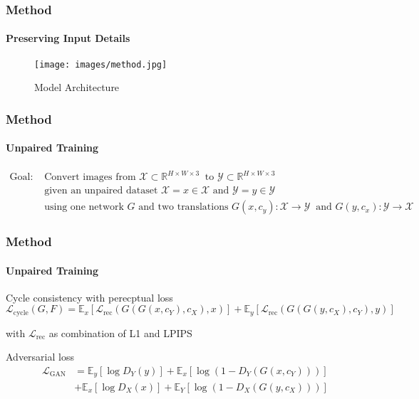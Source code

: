 \documentclass[aspectratio=169, lecture, amberg]{OTHAWbeamer}
\begin{document}
\begin{frame}
\frametitle{Method}
\framesubtitle{Preserving Input Details}
\begin{figure}
    \centering
    \texttt{[image: images/method.jpg]}
    \caption{Model Architecture}
\end{figure}
\end{frame}


\begin{frame}
    \frametitle{Method}
    \framesubtitle{Unpaired Training}
    \begin{align*}
    \text{Goal:} &\text{ Convert images from } \mathcal{X} \subset \mathbb{R} ^{H \times W \times 3} \
    \text{ to } \mathcal{Y} \subset \mathbb{R} ^{H \times W \times 3} \\
    &\text{ given an unpaired dataset } \mathcal{X} = {x \in \mathcal{X} } \text{ and } \mathcal{Y} = {y \in \mathcal{Y} } \\
    &\text{ using one network } G \text{ and two translations } G(x, c_y): \mathcal{X} \rightarrow \mathcal{Y} \
    \text{ and } G(y, c_x): \mathcal{Y} \rightarrow \mathcal{X}
    \end{align*}
    \end{frame}

\begin{frame}
\frametitle{Method}
\framesubtitle{Unpaired Training}
\begin{block}{Cycle consistency with perecptual loss}
    \begin{equation}
        \mathcal{L}_{\text{cycle}}(G, F) = \mathbb{E}_x [ \mathcal{L}_\text{rec} (G(G(x,c_Y), c_X), x) ] + \mathbb{E}_y [ \mathcal{L}_\text{rec} (G(G(y,c_X), c_Y), y) ]
    \end{equation}
\end{block}
with $\mathcal{L}_{\text{rec}}$ as combination of L1 and LPIPS \cite{zhang2018unreasonable}
\begin{block}{Adversarial loss}
    \begin{align}
        \mathcal{L}_{\text{GAN}} &= \mathbb{E}_{y} [\log D_Y(y)] + \mathbb{E}_{x} [\log(1 - D_Y(G(x,c_Y)))] \\
        &+ \mathbb{E}_{x} [\log D_X(x)] + \mathbb{E}_{Y} [\log(1 - D_X(G(y,c_X)))]
    \end{align}
\end{block}
\end{frame}
\end{document}
